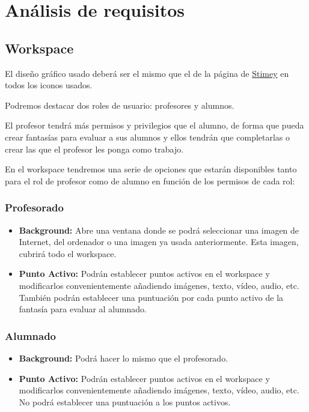 \chapter{Análisis de requisitos}
\section{Workspace}
El diseño gráfico usado deberá ser el mismo que el de la página de \href{https://stimey.eu/home}{Stimey} en todos los iconos usados.

Podremos destacar dos roles de usuario: profesores y alumnos.

El profesor tendrá más permisos y privilegios que el alumno, de forma que pueda crear fantasías para evaluar a sus alumnos y ellos tendrán que completarlas o crear las que el profesor les ponga como trabajo.

En el workspace tendremos una serie de opciones que estarán disponibles tanto para el rol de profesor como de alumno en función de los permisos de cada rol:

\subsection{Profesorado}
\begin{itemize}
	\item \textbf{Background:} Abre una ventana donde se podrá seleccionar una imagen de Internet, del ordenador o una imagen ya usada anteriormente. Esta imagen, cubrirá todo el workspace.
	\item \textbf{Punto Activo:} Podrán establecer puntos activos en el workspace y modificarlos convenientemente añadiendo imágenes, texto, vídeo, audio, etc. También podrán establecer una puntuación por cada punto activo de la fantasía para evaluar al alumnado.
\end{itemize}

\subsection{Alumnado}
\begin{itemize}
	\item \textbf{Background:} Podrá hacer lo mismo que el profesorado.
	\item \textbf{Punto Activo:} Podrán establecer puntos activos en el workspace y modificarlos convenientemente añadiendo imágenes, texto, vídeo, audio, etc. No podrá establecer una puntuación a los puntos activos.
\end{itemize}



